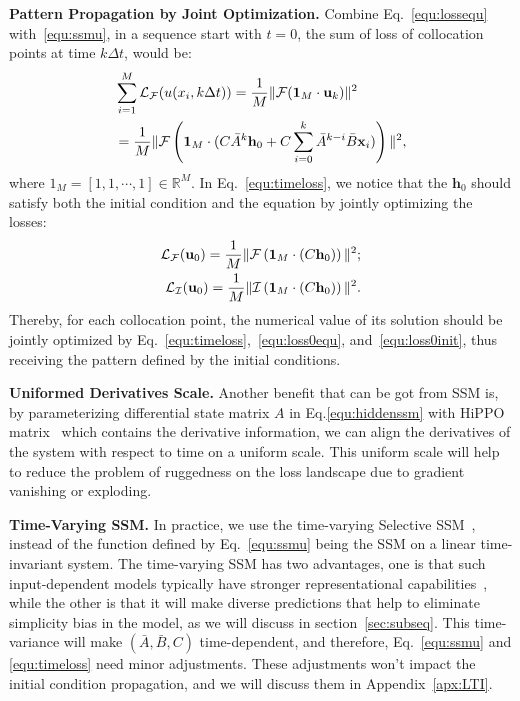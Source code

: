 \documentclass{article}
\theoremstyle{plain}
\theoremstyle{definition}
\theoremstyle{remark}
\begin{document}
\textbf{Pattern Propagation by Joint Optimization.}
Combine Eq.~\ref{equ:lossequ} with~\ref{equ:ssmu}, in a sequence start with $t=0$, the sum of loss of collocation points at time $k\Delta t$, would be: 
\begin{align}
  &\sum_{i=1}^M \mathcal L_\mathcal F(u(x_i,k\Delta t)) =  \frac{1}{M}\mathcal \|\mathcal F( \mathbf 1_M\cdot \mathbf{u}_k)\Arrowvert^2\nonumber\\&=\frac{1}{M}\|\mathcal F\left(\mathbf1_M\cdot(C\bar A^k \mathbf h_0 + C\sum_{i=0}^k\bar A^{k-i}\bar B\mathbf x_i)\right)\Arrowvert^2,
  \label{equ:timeloss}
\end{align}
where $1_M=[1,1,\cdots,1] \in \mathbb R^M$. In Eq.~\ref{equ:timeloss}, we notice that the $\mathbf h_0$ should satisfy both the initial condition and the equation by jointly optimizing the losses:
\begin{align}\label{equ:loss0equ}
   \mathcal L_\mathcal F(\mathbf u_0) =  \frac{1}{M}\|\mathcal F\left(\mathbf1_M\cdot(C \mathbf h_0 )\right)\Arrowvert^2;\\
   \mathcal L_\mathcal I(\mathbf u_0) =  \frac{1}{M}\|\mathcal I\left(\mathbf1_M\cdot(C \mathbf h_0 )\right)\Arrowvert^2 .
   \label{equ:loss0init}
\end{align}
Thereby, for each collocation point, the numerical value of its solution should be jointly optimized by Eq.~\ref{equ:timeloss},~\ref{equ:loss0equ}, and~\ref{equ:loss0init}, thus receiving the pattern defined by the initial conditions.


\textbf{Uniformed Derivatives Scale.} Another benefit that can be got from SSM is, by parameterizing differential state matrix $A$ in Eq.\ref{equ:hiddenssm} with HiPPO matrix~\cite{gu2020hippo} which contains the derivative information,  we can align the derivatives of the system with respect to time on a uniform scale. This uniform scale will help to reduce the problem of ruggedness on the loss landscape due to gradient vanishing or exploding.

\textbf{Time-Varying SSM.} In practice, we use the time-varying Selective SSM~\cite{gu2023mamba}, instead of the function defined by Eq.~\ref{equ:ssmu} being the SSM on a linear time-invariant system. The time-varying SSM has two advantages, one is that such input-dependent models typically have stronger representational capabilities~\cite{xu2024infinite}, while the other is that it will make diverse predictions that help to eliminate simplicity bias in the model, as we will discuss in section~\ref{sec:subseq}. This time-variance will make $(\bar A,\bar B, C)$ time-dependent, and therefore, Eq.~\ref{equ:ssmu} and \ref{equ:timeloss} need minor adjustments. These adjustments won't impact the initial condition propagation, and we will discuss them in Appendix~\ref{apx:LTI}.
\end{document}
